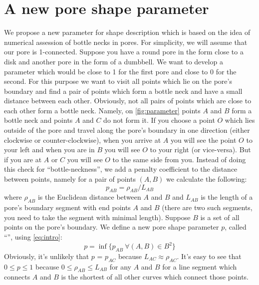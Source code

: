 \documentclass[reprint,amsmath,amssymb,aps,pre,showkeys,showpacs]{revtex4-1}
\newcommand{\highlight}[1]{{\color{red}{#1}}} %
\begin{document}
\section{A new pore shape parameter}
We propose a new parameter for shape description which is based on the idea of
numerical assession of bottle necks in pores. For simplicity, we will assume
that our pore is 1-connected. Suppose you have a round pore in the form close to
a disk and another pore in the form of a dumbbell. We want to develop a
parameter which would be close to 1 for the first pore and close to 0 for the
second. For this purpose we want to visit all points which lie on the pore's
boundary and find a pair of points which form a bottle neck and have a small
distance between each other. Obviously, not all pairs of points which are close
to each other form a bottle neck. Namely, on \cref{fig:parameter} points $A$ and
$B$ form a bottle neck and points $A$ and $C$ do not form it. If you choose a
point $O$ which lies outside of the pore and travel along the pore's boundary in
one direction (either clockwise or counter-clockwise), when you arrive at $A$
you will see the point $O$ to your left and when you are in $B$ you will see $O$
to your right (or vice-versa). But if you are at $A$ or $C$ you will see $O$ to
the same side from you. Instead of doing this check for ``bottle-neckness'', we
add a penalty coefficient to the distance between points, namely for a pair of
points $(A, B)$ we calculate the following:
\begin{equation}
  p_{AB} = \rho_{AB} / L_{AB}
  \label{eq:intro}
\end{equation}
where $\rho_{AB}$ is the Euclidean distance between $A$ and $B$ and $L_{AB}$ is
the length of a pore's boundary segment with end points $A$ and $B$ (there are
two such segments, you need to take the segment with minimal length). Suppose
$B$ is a set of all points on the pore's boundary. We define a new pore shape
parameter $p$, called ``\highlight{awesomeness}'', using \ref{eq:intro}:
\begin{equation}
  p = \inf \{p_{AB} \ \forall (A, B) \in B^2\}
  \label{eq:awesomeness}
\end{equation}
Obviously, it's unlikely that $p$ = $p_{AC}$ because $L_{AC} \approx \rho_{AC}$.
It's easy to see that $0 \le p \le 1$ because $0 \le \rho_{AB} \le L_{AB}$ for
any $A$ and $B$ for a line segment which connects $A$ and $B$ is the shortest
of all other curves which connect those points.
\end{document}
